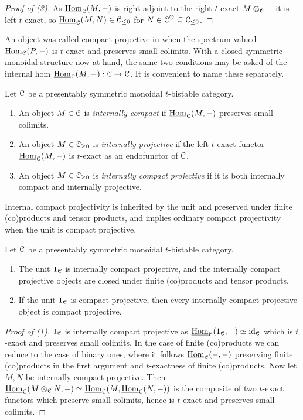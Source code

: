 \begin{proof}[Proof of (3)]
    As $\underline{\mathrm{Hom}}_{\EuScript{C}}(M,-)$ is right adjoint to the right $t$-exact $M\otimes_{\EuScript{C}}-$ it is left $t$-exact, so $\underline{\mathrm{Hom}}_{\EuScript{C}}(M,N)\in\EuScript{C}_{\leq0}$ for $N\in\EuScript{C}^{\heartsuit}\subseteq\EuScript{C}_{\leq0}$.
\end{proof}
An object was called compact projective in  when the spectrum-valued $\mathrm{Hom}_{\EuScript{C}}(P,-)$ is $t$-exact and preserves small colimits. With a closed symmetric monoidal structure now at hand, the same two conditions may be asked of the internal hom $\underline{\mathrm{Hom}}_{\EuScript{C}}(M,-):\EuScript{C}\to\EuScript{C}$. It is convenient to name these separately.
\begin{definition}\label{def: internally compact projective}
    Let $\EuScript{C}$ be a presentably symmetric monoidal $t$-bistable category. 
    \begin{enumerate}
        \item An object $M\in\EuScript{C}$ is \emph{internally compact} if $\underline{\mathrm{Hom}}_{\EuScript{C}}(M,-)$ preserves small colimits. 
        \item An object $M\in\EuScript{C}_{\geq0}$ is \emph{internally projective} if the left $t$-exact functor $\underline{\mathrm{Hom}}_{\EuScript{C}}(M,-)$ is $t$-exact as an endofunctor of $\EuScript{C}$. 
        \item An object $M\in\EuScript{C}_{\geq0}$ is \emph{internally compact projective} if it is both internally compact and internally projective. 
    \end{enumerate}
\end{definition}
Internal compact projectivity is inherited by the unit and preserved under finite (co)products and tensor products, and implies ordinary compact projectivity when the unit is compact projective.
\begin{lemma}\label{lem: permanence of internal compact projectivity}
    Let $\EuScript{C}$ be a presentably symmetric monoidal $t$-bistable category. 
    \begin{enumerate}
        \item The unit $1_{\EuScript{C}}$ is internally compact projective, and the internally compact projective objects are closed under finite (co)products and tensor products. 
        \item If the unit $1_{\EuScript{C}}$ is compact projective, then every internally compact projective object is compact projective. 
    \end{enumerate}
\end{lemma}
\begin{proof}[Proof of (1)]
    $1_{\EuScript{C}}$ is internally compact projective as $\underline{\mathrm{Hom}}_{\EuScript{C}}(1_{\EuScript{C}},-)\simeq\mathrm{id}_{\EuScript{C}}$ which is $t$-exact and preserves small colimits. In the case of finite (co)products we can reduce to the case of binary ones, where it follows $\underline{\mathrm{Hom}}_{\EuScript{C}}(-,-)$ preserving finite (co)products in the first argument and $t$-exactness of finite (co)products. Now let $M,N$ be internally compact projective. Then $\underline{\mathrm{Hom}}_{\EuScript{C}}(M\otimes_{\EuScript{C}}N,-)\simeq\underline{\mathrm{Hom}}_{\EuScript{C}}(M,\underline{\mathrm{Hom}}_{\EuScript{C}}(N,-))$ is the composite of two $t$-exact functors which preserve small colimits, hence is $t$-exact and preserves small colimits.
\end{proof}
